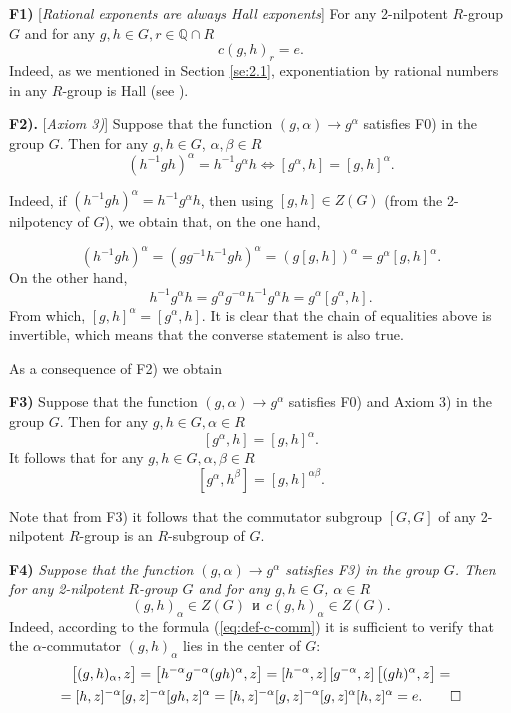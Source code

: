 \documentclass[11pt]{article}
\theoremstyle{definition}
\begin{document}
\medskip
\noindent 
{\bf F1)} [{\it Rational exponents are always Hall exponents}] 
For any 2-nilpotent $R$-group $G$ and for any $g,h \in G, r \in \mathbb{Q} \cap R$
\begin{equation} \label{eq:rationalb}
    c(g,h)_{r}= e. 
\end{equation}
Indeed, as we mentioned in Section \ref{se:2.1}, exponentiation by rational numbers in any $R$-group is Hall (see \cite{ABM}).

\medskip
\noindent 
{\bf F2).} [{\it Axiom 3)}] Suppose that the function $(g,\alpha) \to g^\alpha$ satisfies F0) in the group $G$. Then for any $g, h \in G$, $\alpha, \beta \in R$
\begin{equation} \label{eq:14}
(h^{-1}gh)^\alpha = h^{-1}g^\alpha h \Longleftrightarrow [g^\alpha,h] = [g,h]^{\alpha}.
\end{equation}

Indeed, if $(h^{-1}gh)^\alpha = h^{-1}g^\alpha h$, then using $[g,h] \in Z(G)$ (from the 2-nilpotency of $G$), we obtain that, on the one hand,  

$$
(h^{-1}gh)^\alpha = (gg^{-1}h^{-1}gh)^\alpha = (g[g,h])^\alpha = g^\alpha[g,h]^\alpha.
$$
On the other hand,
$$
h^{-1}g^\alpha h = g^\alpha g^{-\alpha}h^{-1}g^\alpha h = g^\alpha[g^\alpha,h].
$$
From which, $[g,h]^\alpha = [g^\alpha,h]$. It is clear that the chain of equalities above is invertible, which means that the converse statement is also true.

\medskip
As a consequence of F2) we obtain

\medskip
\noindent 
{\bf F3)} Suppose that the function $(g,\alpha) \to g^\alpha$ satisfies F0) and Axiom 3) in the group $G$. Then for any $g,h \in G, \alpha \in R$
\begin{equation} \label{eq:rationalb2}
    [g^\alpha,h] = [g,h]^{\alpha}. 
\end{equation}
It follows that for any $g,h \in G, \alpha, \beta \in R$
$$
  [g^\alpha,h^\beta] = [g,h]^{\alpha \beta}.
$$

\medskip
\noindent 
Note that from F3) it follows that the commutator subgroup $[G,G]$ of any 2-nilpotent $R$-group is an $R$-subgroup of $G$.


\medskip
\noindent 
{\bf F4)} {\it  Suppose that the function $(g,\alpha) \to g^\alpha$ satisfies F3) in the group $G$. Then for any 2-nilpotent $R$-group $G$ and for any $g, h \in G$, $\alpha \in R$
\begin{equation} \label{eq:fact3}
   (g,h)_\alpha \in Z(G) \ \ \text{и} \ \  c(g,h)_\alpha \in Z(G).
\end{equation}
}
Indeed, according to the formula (\ref{eq:def-c-comm}) it is sufficient to verify that the $\alpha$-commutator $(g,h)_{\alpha}$ lies in the center of $G$:
\begin{multline*}
\big[(g,h)_{\alpha},z\big]=\big[h^{-\alpha}g^{-\alpha}(gh)^{\alpha},z\big]=[h^{-\alpha},z]\,[g^{-\alpha},z]\,\big[(gh)^{\alpha},z\big]= \\
    =[h,z]^{-\alpha}[g,z]^{-\alpha}[gh,z]^{\alpha}=[h,z]^{-\alpha}[g,z]^{-\alpha}[g,z]^{\alpha}[h,z]^{\alpha}=e. \qedhere
\end{multline*}
\end{document}
